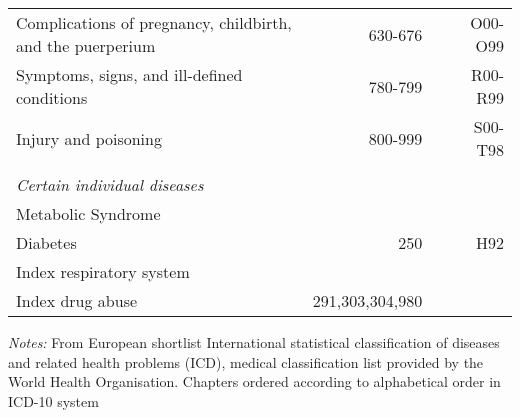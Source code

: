 \documentclass{scrartcl} %
\begin{document}
\begin{table}[h]
\begin{threeparttable}
\begin{tabular}{lrrr}
 \hspace{4pt} Complications of pregnancy, childbirth, and the puerperium  	&	630-676		& &		O00-O99 \\
 \hspace{4pt} Symptoms, signs, and ill-defined conditions                 	&	780-799		& &		R00-R99 \\
 \hspace{4pt} Injury and poisoning                                        	&	800-999		& &		S00-T98 \\
\\
\textit{Certain individual diseases}\\
 \hspace{4pt} Metabolic Syndrome      										&				& &		\\
 \hspace{10pt} Diabetes														& 250 & &  H92\\
 \hspace{4pt} Index respiratory system										&					& &		\\
 \hspace{4pt} Index drug abuse        										&	291,303,304,980 & &		\\

\bottomrule %
\end{tabular}
\begin{tablenotes}
      \scriptsize{ \item \textit{Notes:} From European shortlist
      International statistical classification of diseases and related health problems (ICD), medical classification list provided by the World Health Organisation. Chapters ordered according to alphabetical order in ICD-10 system}
    \end{tablenotes}
  \end{threeparttable}
\end{table}
\end{document}
